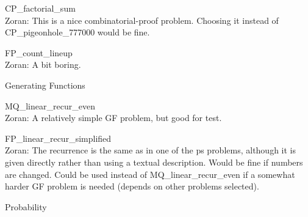 \documentclass[quiz]{mcs}
\begin{document}
\begin{staffnotes}
CP\_factorial\_sum\\
Zoran: This is a nice combinatorial-proof problem. Choosing it instead of CP\_pigeonhole\_777000
would be fine.
\end{staffnotes}

\begin{staffnotes}
FP\_count\_lineup\\
Zoran: A bit boring.
\end{staffnotes}



\begin{staffnotes}
\begin{center}
{\large Generating Functions}
\end{center}
\end{staffnotes}

\begin{staffnotes}
MQ\_linear\_recur\_even\\
Zoran: A relatively simple GF problem, but good for test.
\end{staffnotes}

\examspace
\begin{staffnotes}
FP\_linear\_recur\_simplified\\
Zoran: The recurrence is the same as in one of the ps problems, although it is given directly
rather than using a textual description.
Would be fine if numbers are changed. Could be used instead of MQ\_linear\_recur\_even
if a somewhat harder GF problem is needed (depends on other problems selected).
\end{staffnotes}




\begin{staffnotes}
\begin{center}
{\large Probability}
\end{center}
\end{staffnotes}
\end{document}
